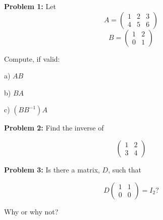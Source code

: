 \documentclass[a4paper,12pt]{article}
\begin{document}
{\Large{\bf Problem 1:}} Let \[ A= \left( \begin{array}{ccc}1 & 2 & 3 \\
4 & 5 & 6  \end{array} \right)\]\[ B = \left( \begin{array}{ccc}
1 & 2\\
0 & 1\end{array} \right)\] 

Compute, if valid:

a) $AB$


b) $BA$



c) $(BB^{-1})A$




{\Large{\bf Problem 2:}} Find the inverse of

\[\left( \begin{array}{ccc}
1 & 2\\
3 & 4\end{array} \right)\] 

{\Large{\bf Problem 3:}} Is there a matrix, $D$, such that

\[D\left( \begin{array}{ccc}
1 & 1\\
0 & 0\end{array} \right) = I_2 ?\] 

Why or why not? 
\end{document}
